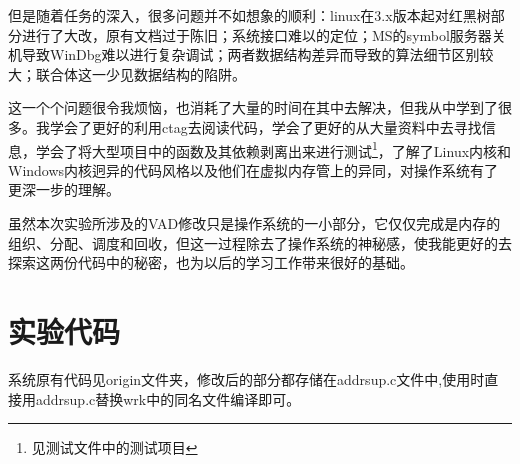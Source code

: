 但是随着任务的深入，很多问题并不如想象的顺利：linux在3.x版本起对红黑树部分进行了大改，原有文档过于陈旧；系统接口难以的定位；MS的symbol服务器关机导致WinDbg难以进行复杂调试；两者数据结构差异而导致的算法细节区别较大；联合体这一少见数据结构的陷阱。

这一个个问题很令我烦恼，也消耗了大量的时间在其中去解决，但我从中学到了很多。我学会了更好的利用ctag去阅读代码，学会了更好的从大量资料中去寻找信息，学会了将大型项目中的函数及其依赖剥离出来进行测试\footnote{见测试文件中的测试项目}，了解了Linux内核和Windows内核迥异的代码风格以及他们在虚拟内存管上的异同，对操作系统有了更深一步的理解。

虽然本次实验所涉及的VAD修改只是操作系统的一小部分，它仅仅完成是内存的组织、分配、调度和回收，但这一过程除去了操作系统的神秘感，使我能更好的去探索这两份代码中的秘密，也为以后的学习工作带来很好的基础。
\section{实验代码}
系统原有代码见origin文件夹，修改后的部分都存储在addrsup.c文件中,使用时直接用addrsup.c替换wrk中的同名文件编译即可。


